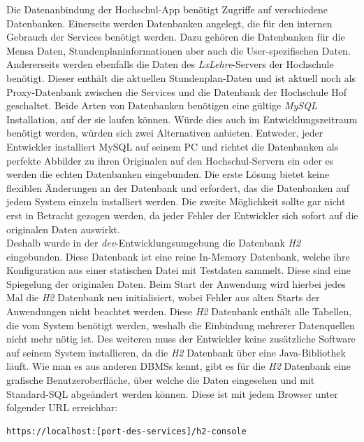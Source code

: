 Die Datenanbindung der Hochschul-\ac{App} benötigt Zugriffe auf verschiedene Datenbanken. Einerseits werden Datenbanken angelegt, die für den internen Gebrauch der Services benötigt werden. Dazu gehören die Datenbanken für die Mensa Daten, Stundenplaninformationen aber auch die User-spezifischen Daten. Andererseits werden ebenfalls die Daten des \textit{LxLehre}-Servers der Hochschule benötigt. Dieser enthält die aktuellen Stundenplan-Daten und ist aktuell noch als Proxy-Datenbank zwischen die Services und die Datenbank der Hochschule Hof geschaltet. Beide Arten von Datenbanken benötigen eine gültige \textit{MySQL} Installation, auf der sie laufen können. Würde dies auch im Entwicklungszeitraum benötigt werden, würden sich zwei Alternativen anbieten. Entweder, jeder Entwickler installiert MySQL auf seinem \ac{PC} und richtet die Datenbanken als perfekte Abbilder zu ihren Originalen auf den Hochschul-Servern ein oder es werden die echten Datenbanken eingebunden. Die erste Lösung bietet keine flexiblen Änderungen an der Datenbank und erfordert, das die Datenbanken auf jedem System einzeln installiert werden. Die zweite Möglichkeit sollte gar nicht erst in Betracht gezogen werden, da jeder Fehler der Entwickler sich sofort auf die originalen Daten auswirkt.\\
\linebreak
Deshalb wurde in der  \textit{dev}-Entwicklungsumgebung die Datenbank \textit{H2} eingebunden. Diese Datenbank ist eine reine In-Memory Datenbank, welche ihre Konfiguration aus einer statischen Datei mit Testdaten sammelt. Diese sind eine Spiegelung der originalen Daten. Beim Start der Anwendung wird hierbei jedes Mal die \textit{H2} Datenbank neu initialisiert, wobei Fehler aus alten Starts der Anwendungen nicht beachtet werden. Diese \textit{H2} Datenbank enthält alle Tabellen, die vom System benötigt werden, weshalb die Einbindung mehrerer Datenquellen nicht mehr nötig ist. Des weiteren muss der Entwickler keine zusätzliche Software auf seinem System installieren, da die \textit{H2} Datenbank über eine Java-Bibliothek läuft. Wie man es aus anderen \acp{DBMS} kennt, gibt es für die \textit{H2} Datenbank eine grafische Benutzeroberfläche, über welche die Daten eingesehen und mit Standard-\ac{SQL} abgeändert werden können. Diese ist mit jedem Browser unter folgender \ac{URL} erreichbar:

\begin{lstlisting}[caption={H2-Console}]
https://localhost:[port-des-services]/h2-console
\end{lstlisting}

